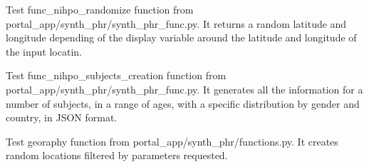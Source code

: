 \documentclass[letterpaper,10pt,english]{sphinxmanual}
\begin{document}
\begin{fulllineitems}
\begin{fulllineitems}
\end{fulllineitems}


\begin{fulllineitems}
\label{\detokenize{CE_app.tests:CE_app.tests.test_phr.PHRTestCase.test_func_nihpo_randomize}}
\sphinxAtStartPar
Test func\_nihpo\_randomize function from portal\_app/synth\_phr/synth\_phr\_func.py.
It returns a random latitude and longitude depending of the display variable around the
latitude and longitude of the input locatin.

\end{fulllineitems}


\begin{fulllineitems}
\label{\detokenize{CE_app.tests:CE_app.tests.test_phr.PHRTestCase.test_func_nihpo_subjects_creation}}
\sphinxAtStartPar
Test func\_nihpo\_subjects\_creation function from portal\_app/synth\_phr/synth\_phr\_func.py.
It generates all the information for a number of subjects, in a range of ages,
with a specific distribution by gender and country, in JSON format.

\end{fulllineitems}


\begin{fulllineitems}
\label{\detokenize{CE_app.tests:CE_app.tests.test_phr.PHRTestCase.test_geography}}
\sphinxAtStartPar
Test georaphy function from portal\_app/synth\_phr/functions.py.
It creates random locations filtered by parameters requested.

\end{fulllineitems}


\end{fulllineitems}
\end{document}
